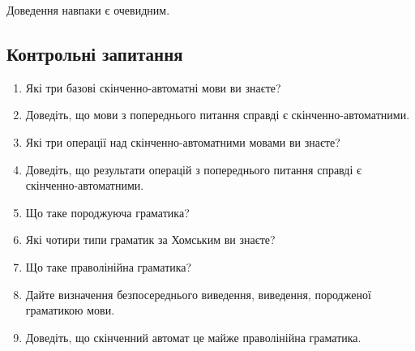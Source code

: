 Доведення навпаки є очевидним.

\subsection{Контрольні запитання}

\begin{enumerate}
	\item Які три базові скінченно-автоматні мови ви знаєте? %
	\item Доведіть, що мови з попереднього питання справді є скін\-чен\-но-ав\-то\-мат\-ни\-ми.
	\item Які три операції над скінченно-автоматними мовами ви знаєте? %
	\item Доведіть, що результати операцій з попереднього питання справді є скін\-чен\-но-ав\-то\-мат\-ни\-ми.
	\item Що таке породжуюча граматика? %
	\item Які чотири типи граматик за Хомським ви знаєте? %
	\item Що таке праволінійна граматика? %
	\item Дайте визначення безпосереднього виведення, виведення, породженої граматикою мови.
	\item Доведіть, що скінченний автомат це майже праволінійна граматика.
\end{enumerate}
